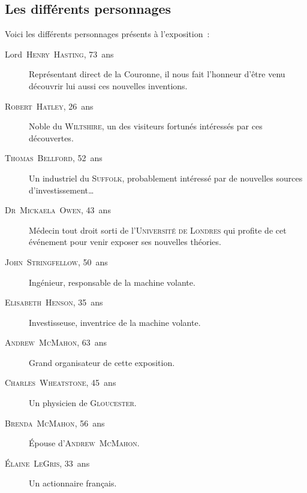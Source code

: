 {\subsection{Les différents personnages}

Voici les différents personnages présents à l’exposition~:
\begin{description}
\item[Lord~\textsc{Henry~Hasting}, 73~ans] Représentant direct de la Couronne, il nous fait l’honneur d’être venu découvrir lui aussi ces nouvelles inventions.
\item[\textsc{Robert~Hatley}, 26~ans] Noble du \textsc{Wiltshire}, un des visiteurs fortunés intéressés par ces découvertes.
\item[\textsc{Thomas~Bellford}, 52~ans] Un industriel du \textsc{Suffolk}, probablement intéressé par de nouvelles sources d’investissement…
\item[\textsc{Dr~Mickaela~Owen}, 43~ans] Médecin tout droit sorti de l’\textsc{Université de Londres} qui profite de cet événement pour venir exposer ses nouvelles théories.
\item[\textsc{John~Stringfellow}, 50~ans] Ingénieur, responsable de la machine volante.
\item[\textsc{Elisabeth~Henson}, 35~ans] Investisseuse, inventrice de la machine volante.
\item[\textsc{Andrew~McMahon}, 63~ans] Grand organisateur de cette exposition.
\item[\textsc{Charles~Wheatstone}, 45~ans] Un physicien de \textsc{Gloucester}.
\item[\textsc{Brenda~McMahon}, 56~ans] Épouse d’\textsc{Andrew~McMahon}.
\item[\textsc{Élaine~LeGris}, 33~ans] Un actionnaire français.
\end{description}
}

